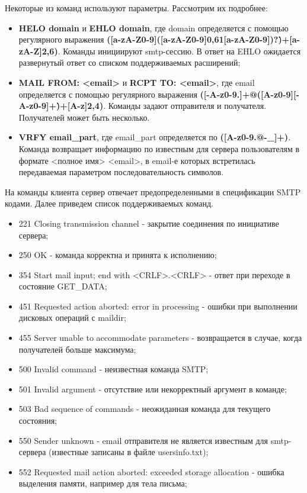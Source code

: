 \documentclass[a4paper,12pt]{report}
\begin{document}
Некоторые из команд используют параметры. Рассмотрим их подробнее:
\begin{itemize}
	\item \textbf{HELO domain} и \textbf{EHLO domain}, где domain определяется с помощью регулярного выражения \textbf{([a-zA-Z0-9]([a-zA-Z0-9\-]{0,61}[a-zA-Z0-9])?\.)+[a-zA-Z]{2,6})}. Команды инициируют smtp-сессию. В ответ на EHLO ожидается развернутый ответ со списком поддерживаемых расширений;
	\item \textbf{MAIL FROM: <email>} и \textbf{RCPT TO: <email>}, где email определяется с помощью регулярного выражения \textbf{([-A-z0-9.]+@([A-z0-9][-A-z0-9]+\.)+[A-z]{2,4})}. Команды задают отправителя и получателя. Получателей может быть несколько.
	\item \textbf{VRFY email\_part}, где email\_part определяется по \textbf{([A-z0-9.@-\_]+)}. Команда возвращает информацию по известным для сервера пользователям в формате <полное имя> <email>, в email-е которых встретилась передаваемая параметром последовательность символов.
\end{itemize}

На команды клиента сервер отвечает предопределенными в спецификации SMTP кодами. Далее приведем список поддерживаемых команд.
\begin{itemize}
	\item 221 Closing transmission channel - закрытие соединения по инициативе сервера;
	\item 250 OK - команда корректна и принята к исполнению;
	\item 354 Start mail input; end with <CRLF>.<CRLF> - ответ при переходе в состояние GET\_DATA;
	\item 451 Requested action aborted: error in processing - ошибки при выполнении дисковых операций с maildir;
	\item 455 Server unable to accommodate parameters - возвращается в случае, когда получателей больше максимума;
	\item 500 Invalid command - неизвестная команда SMTP;
	\item 501 Invalid argument - отсутствие или некорректный аргумент в команде;
	\item 503 Bad sequence of commands - неожиданная команда для текущего состояния;
	\item 550 Sender unknown - email отправителя не является известным для smtp-сервера (известные записаны в файле usersinfo.txt);
	\item 552 Requested mail action aborted: exceeded storage allocation - ошибка выделения памяти, например для тела письма;
\end{itemize}
\end{document}
